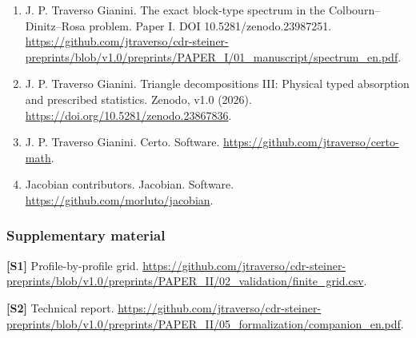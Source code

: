 \documentclass[english,11pt,a4paper]{article}
\begin{document}
\begin{enumerate}
\item
  J. P. Traverso Gianini. The exact block-type spectrum in the Colbourn--Dinitz--Rosa problem. Paper I. DOI 10.5281/zenodo.23987251. \url{https://github.com/jtraverso/cdr-steiner-preprints/blob/v1.0/preprints/PAPER_I/01_manuscript/spectrum_en.pdf}.
\item
  J. P. Traverso Gianini. Triangle decompositions III: Physical typed absorption and prescribed statistics. Zenodo, v1.0 (2026). \url{https://doi.org/10.5281/zenodo.23867836}.
\item
  J. P. Traverso Gianini. Certo. Software. \url{https://github.com/jtraverso/certo-math}.
\item
  Jacobian contributors. Jacobian. Software. \url{https://github.com/morluto/jacobian}.
\end{enumerate}

\subsubsection{Supplementary material}\label{supplementary-material}

\textbf{{[}S1{]}} Profile-by-profile grid. \url{https://github.com/jtraverso/cdr-steiner-preprints/blob/v1.0/preprints/PAPER_II/02_validation/finite_grid.csv}.

\textbf{{[}S2{]}} Technical report. \url{https://github.com/jtraverso/cdr-steiner-preprints/blob/v1.0/preprints/PAPER_II/05_formalization/companion_en.pdf}.
\end{document}
